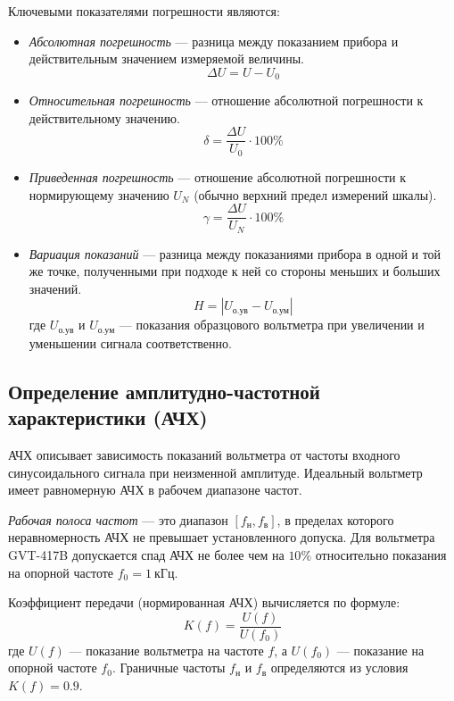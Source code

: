 Ключевыми показателями погрешности являются:
\begin{itemize}
    \item \textit{Абсолютная погрешность} — разница между показанием прибора и действительным значением измеряемой величины.
    \begin{equation}
        \label{eq:abs_err}
        \Delta U = U - U_0
    \end{equation}
    \item \textit{Относительная погрешность} — отношение абсолютной погрешности к действительному значению.
    \begin{equation}
        \label{eq:rel_err}
        \delta = \frac{\Delta U}{U_0} \cdot 100\%
    \end{equation}
    \item \textit{Приведенная погрешность} — отношение абсолютной погрешности к нормирующему значению $U_N$ (обычно верхний предел измерений шкалы).
    \begin{equation}
        \label{eq:reduced_err}
        \gamma = \frac{\Delta U}{U_N} \cdot 100\%
    \end{equation}
    \item \textit{Вариация показаний} — разница между показаниями прибора в одной и той же точке, полученными при подходе к ней со стороны меньших и больших значений.
    \begin{equation}
        \label{eq:variation}
        H = |U_{\text{о.ув}} - U_{\text{о.ум}}|
    \end{equation}
    где $U_{\text{о.ув}}$ и $U_{\text{о.ум}}$ — показания образцового вольтметра при увеличении и уменьшении сигнала соответственно.
\end{itemize}

\subsection*{Определение амплитудно-частотной характеристики (АЧХ)}
АЧХ описывает зависимость показаний вольтметра от частоты входного синусоидального сигнала при неизменной амплитуде. Идеальный вольтметр имеет равномерную АЧХ в рабочем диапазоне частот.

\textit{Рабочая полоса частот} — это диапазон $[f_\text{н}, f_\text{в}]$, в пределах которого неравномерность АЧХ не превышает установленного допуска. Для вольтметра GVT-417B допускается спад АЧХ не более чем на $10\%$ относительно показания на опорной частоте $f_0 = 1~\text{кГц}$.

Коэффициент передачи (нормированная АЧХ) вычисляется по формуле:
\begin{equation}
    \label{eq:afc_coeff}
    K(f) = \frac{U(f)}{U(f_0)}
\end{equation}
где $U(f)$ — показание вольтметра на частоте $f$, а $U(f_0)$ — показание на опорной частоте $f_0$. Граничные частоты $f_\text{н}$ и $f_\text{в}$ определяются из условия $K(f) = 0.9$.

